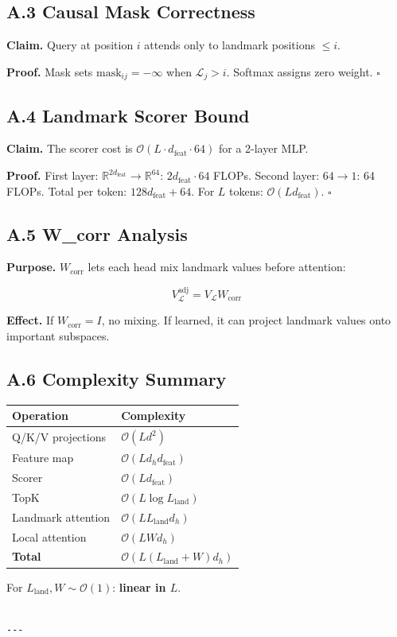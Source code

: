 \subsection{A.3 Causal Mask Correctness}

\textbf{Claim.} Query at position $i$ attends only to landmark positions $\leq i$.

\textbf{Proof.} Mask sets $\text{mask}_{ij} = -\infty$ when $\mathcal{L}_j > i$. 
Softmax assigns zero weight. $\square$

\subsection{A.4 Landmark Scorer Bound}

\textbf{Claim.} The scorer cost is $\mathcal{O}(L \cdot d_\text{feat} \cdot 64)$ 
for a 2-layer MLP.

\textbf{Proof.} First layer: $\mathbb{R}^{2 d_\text{feat}} \to \mathbb{R}^{64}$: 
$2 d_\text{feat} \cdot 64$ FLOPs. Second layer: $64 \to 1$: 64 FLOPs. Total 
per token: $128 d_\text{feat} + 64$. For $L$ tokens: $\mathcal{O}(L d_\text{feat})$. $\square$

\subsection{A.5 W\_corr Analysis}

\textbf{Purpose.} $W_\text{corr}$ lets each head mix landmark values before 
attention:

\[
V_\mathcal{L}^\text{adj} = V_\mathcal{L} W_\text{corr}
\tag{A.7}
\]

\textbf{Effect.} If $W_\text{corr} = I$, no mixing. If learned, it can project 
landmark values onto important subspaces.

\subsection{A.6 Complexity Summary}

\begin{table}[H]
\centering
\small
\begin{tabular}{ll}
\toprule
\textbf{Operation} & \textbf{Complexity} \\
\midrule
Q/K/V projections & $\mathcal{O}(L d^2)$ \\
Feature map & $\mathcal{O}(L d_h d_\text{feat})$ \\
Scorer & $\mathcal{O}(L d_\text{feat})$ \\
TopK & $\mathcal{O}(L \log L_\text{land})$ \\
Landmark attention & $\mathcal{O}(L L_\text{land} d_h)$ \\
Local attention & $\mathcal{O}(L W d_h)$ \\
\textbf{Total} & $\mathcal{O}(L(L_\text{land} + W) d_h)$ \\
\bottomrule
\end{tabular}
\end{table}

For $L_\text{land}, W \sim \mathcal{O}(1)$: \textbf{linear in $L$}.
\begin{lstlisting}

---
\end{lstlisting}